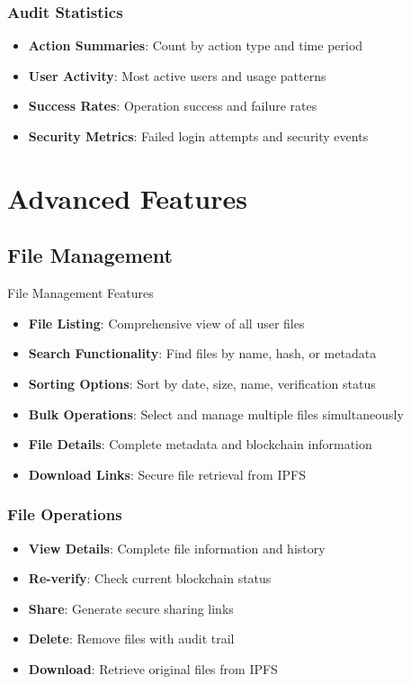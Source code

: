 \documentclass[11pt,a4paper]{article}
\begin{document}
\subsubsection{Audit Statistics}
\begin{itemize}
    \item \textbf{Action Summaries}: Count by action type and time period
    \item \textbf{User Activity}: Most active users and usage patterns
    \item \textbf{Success Rates}: Operation success and failure rates
    \item \textbf{Security Metrics}: Failed login attempts and security events
\end{itemize}

\section{Advanced Features}

\subsection{File Management}

\begin{featurebox}{\faFolderOpen\space File Management Features}
\begin{itemize}
    \item \textbf{File Listing}: Comprehensive view of all user files
    \item \textbf{Search Functionality}: Find files by name, hash, or metadata
    \item \textbf{Sorting Options}: Sort by date, size, name, verification status
    \item \textbf{Bulk Operations}: Select and manage multiple files simultaneously
    \item \textbf{File Details}: Complete metadata and blockchain information
    \item \textbf{Download Links}: Secure file retrieval from IPFS
\end{itemize}
\end{featurebox}

\subsubsection{File Operations}
\begin{itemize}
    \item \textbf{View Details}: Complete file information and history
    \item \textbf{Re-verify}: Check current blockchain status
    \item \textbf{Share}: Generate secure sharing links
    \item \textbf{Delete}: Remove files with audit trail
    \item \textbf{Download}: Retrieve original files from IPFS
\end{itemize}
\end{document}
